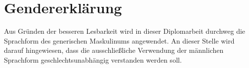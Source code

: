 \section*{Gendererklärung}

Aus Gründen der besseren Lesbarkeit wird in dieser Diplomarbeit durchweg die Sprachform des generischen Maskulinums angewendet. An dieser Stelle wird darauf hingewiesen, dass die ausschließliche Verwendung der männlichen Sprachform geschlechtsunabhängig verstanden werden soll.

\newpage